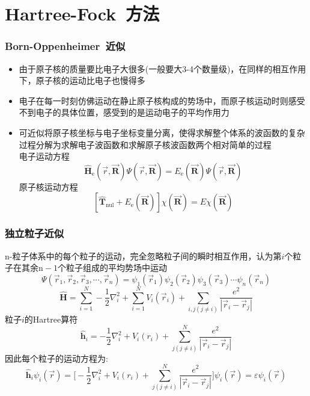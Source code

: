\section{\rm{Hartree-Fock~}方法}
\frame
{
	\frametitle{\textrm{Born-Oppenheimer~}近似}
	\begin{itemize}
		\item 由于原子核的质量要比电子大很多(一般要大3-4个数量级)，在同样的相互作用下，原子核的运动比电子也慢得多
		\item 电子在每一时刻仿佛运动在静止原子核构成的势场中，而原子核运动时则感受不到电子的具体位置，感受到的是运动电子的平均作用力
		\item 可近似将原子核坐标与电子坐标变量分离，使得求解整个体系的波函数的复杂过程分解为求解电子波函数和求解原子核波函数两个相对简单的过程\\
			电子运动方程$$\hat{\mathbf H}_{\mathrm e}(\vec r,\vec{\mathbf R})\Psi(\vec r,\vec{\mathbf R})=E_{\mathrm e}(\vec{\mathbf R})\Psi(\vec r,\vec{\mathbf R})$$
			原子核运动方程$$[\hat{\mathbf T}_{\mathrm{nul}}+E_{\mathrm e}(\vec{\mathbf R})]\chi(\vec{\mathbf R})=E\chi(\vec{\mathbf R})$$
	\end{itemize}
}

\frame
{
	\frametitle{独立粒子近似}
	\textrm{n-}粒子体系中的每个粒子的运动，完全忽略粒子间的瞬时相互作用，认为第$i$个粒子在其余$\mathrm{n}-1$个粒子组成的平均势场中运动
	$$\Psi(\vec r_1,\vec r_2,\vec r_3,\cdots,\vec r_n)=\psi_1(\vec r_1)\psi_2(\vec r_2)\psi_3(\vec r_3)\cdots\psi_n(\vec r_n)$$
	$$\hat{\mathbf H}=\sum_{i=1}^N-\dfrac{1}{2}\nabla_i^2+\sum_{i=1}^NV_i(\vec r_i)+\sum_{i,j(j\neq i)}\dfrac{e^2}{|\vec r_i-\vec r_j|}$$
	粒子$i$的\textrm{Hartree}算符
	$$\hat{\mathbf h}_i=-\dfrac{1}{2}\nabla_i^2+V_i(r_i)+\sum_{j(j\neq i)}^N\dfrac{e^2}{|\vec r_i-\vec r_j|}$$
	因此每个粒子的运动方程为:
	$$\hat{\mathbf h}_i\psi_i(\vec r)=\bigg[-\dfrac{1}{2}\nabla_i^2+V_i(r_i)+\sum_{j(j\neq i)}^N\dfrac{e^2}{|\vec r_i-\vec r_j|}\bigg]\psi_i(\vec r)=\varepsilon\psi_i(\vec r)$$ 
}

